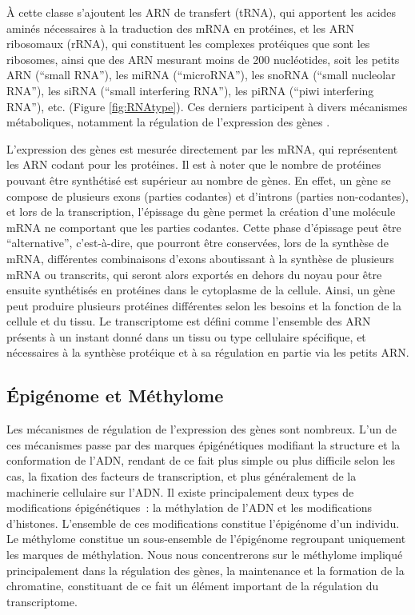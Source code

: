 \documentclass[11pt,a4paper,notrimn]{krantz}
\theoremstyle{definition}
\theoremstyle{definition}
\theoremstyle{remark}
\begin{document}
À cette classe s'ajoutent les ARN de transfert (tRNA), qui apportent les
acides aminés nécessaires à la traduction des mRNA en protéines, et les
ARN ribosomaux (rRNA), qui constituent les complexes protéiques que sont
les ribosomes, ainsi que des ARN mesurant moins de 200 nucléotides, soit
les petits ARN (``small RNA''), les miRNA (``microRNA''), les snoRNA
(``small nucleolar RNA''), les siRNA (``small interfering RNA''), les
piRNA (``piwi interfering RNA''), etc. (Figure \ref{fig:RNAtype}). Ces
derniers participent à divers mécanismes métaboliques, notamment la
régulation de l'expression des gènes
\citep{ambros_functions_2004, bartel_micrornas:_2004}.

L'expression des gènes est mesurée directement par les mRNA, qui
représentent les ARN codant pour les protéines. Il est à noter que le
nombre de protéines pouvant être synthétisé est supérieur au nombre de
gènes. En effet, un gène se compose de plusieurs exons (parties
codantes) et d'introns (parties non-codantes), et lors de la
transcription, l'épissage du gène permet la création d'une molécule mRNA
ne comportant que les parties codantes. Cette phase d'épissage peut être
``alternative'', c'est-à-dire, que pourront être conservées, lors de la
synthèse de mRNA, différentes combinaisons d'exons aboutissant à la
synthèse de plusieurs mRNA ou transcrits, qui seront alors exportés en
dehors du noyau pour être ensuite synthétisés en protéines dans le
cytoplasme de la cellule. Ainsi, un gène peut produire plusieurs
protéines différentes selon les besoins et la fonction de la cellule et
du tissu. Le transcriptome est défini comme l'ensemble des ARN présents
à un instant donné dans un tissu ou type cellulaire spécifique, et
nécessaires à la synthèse protéique et à sa régulation en partie via les
petits ARN.

\subsection{Épigénome et Méthylome}\label{epigenome-et-methylome}

Les mécanismes de régulation de l'expression des gènes sont nombreux.
L'un de ces mécanismes passe par des marques épigénétiques modifiant la
structure et la conformation de l'ADN, rendant de ce fait plus simple ou
plus difficile selon les cas, la fixation des facteurs de transcription,
et plus généralement de la machinerie cellulaire sur l'ADN. Il existe
principalement deux types de modifications épigénétiques~: la
méthylation de l'ADN et les modifications d'histones. L'ensemble de ces
modifications constitue l'épigénome d'un individu. Le méthylome
constitue un sous-ensemble de l'épigénome regroupant uniquement les
marques de méthylation. Nous nous concentrerons sur le méthylome
impliqué principalement dans la régulation des gènes, la maintenance et
la formation de la chromatine, constituant de ce fait un élément
important de la régulation du transcriptome.
\end{document}
